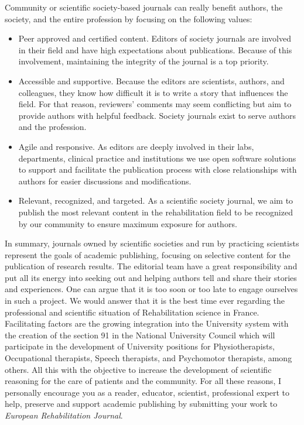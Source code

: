 Community or scientific society-based journals can really benefit authors, the society, and the entire profession by focusing on the following values: 
\begin{itemize}
    \item Peer approved and certified content. Editors of society journals are involved in their field and have high expectations about publications. Because of this involvement, maintaining the integrity of the journal is a top priority.
    \item Accessible and supportive. Because the editors are scientists, authors, and colleagues, they know how difficult it is to write a story that influences the field. For that reason, reviewers’ comments may seem conflicting but aim to provide authors with helpful feedback. Society journals exist to serve authors and the profession.
    \item Agile and responsive. As editors are deeply involved in their labs, departments, clinical practice and institutions we use open software solutions to support and facilitate the publication process with close relationships with authors for easier discussions and modifications.
    \item Relevant, recognized, and targeted. As a scientific society journal, we aim to publish the most relevant content in the rehabilitation field to be recognized by our community to ensure maximum exposure for authors.
\end{itemize}

In summary, journals owned by scientific societies and run by practicing scientists represent the goals of academic publishing, focusing on selective content for the publication of research results. The editorial team have a great responsibility and put all its energy into seeking out and helping authors tell and share their stories and experiences. One can argue that it is too soon or too late to engage ourselves in such a project. We would answer that it is the best time ever regarding the professional and scientific situation of Rehabilitation science in France. Facilitating factors are the growing integration into the University system with the creation of the section 91 in the National University Council \citep{noauthor_decret_2019}
which will participate in the development of University positions for Physiotherapists, Occupational therapists, Speech therapists, and Psychomotor therapists, among others. All this with the objective to increase the development of scientific reasoning for the care of patients and the community. For all these reasons, I personally encourage you as a reader, educator, scientist, professional expert to help, preserve and support academic publishing by submitting your work to \textit{European Rehabilitation Journal}.